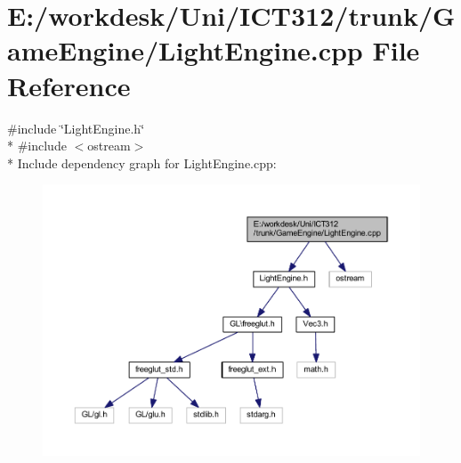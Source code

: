 \section{E\+:/workdesk/\+Uni/\+I\+C\+T312/trunk/\+Game\+Engine/\+Light\+Engine.cpp File Reference}
\label{_light_engine_8cpp}
{\ttfamily \#include \char`\"{}Light\+Engine.\+h\char`\"{}}\\*
{\ttfamily \#include $<$ostream$>$}\\*
Include dependency graph for Light\+Engine.\+cpp\+:\nopagebreak
\begin{figure}[H]
\begin{center}
\leavevmode
\includegraphics[width=350pt]{dd/d20/_light_engine_8cpp__incl}
\end{center}
\end{figure}
